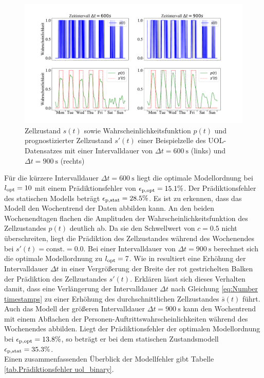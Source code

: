 \begin{figure}[!h]
	\centering
	\includegraphics[width=1.0\linewidth]{Abbildungen/evaluation/bin_size_influence_cell_row_23_col_25_binary_numero_due}
	\caption{Zellzustand $s(t)$ sowie Wahrscheinlichkeitsfunktion $p(t)$ und prognostizierter Zellzustand $s'(t)$ einer Beispielzelle des UOL-Datensatzes mit einer Intervalldauer von $\Delta t = \SI{600}{\second} $ (links) und $\Delta t = \SI{900}{\second} $ (rechts)}
	\label{fig.bin_size_influence_cell_row_23_col_25_binary}
\end{figure}

Für die kürzere Intervalldauer $\Delta t = \SI{600}{\second}$ liegt die optimale Modellordnung bei $l_{\mathrm{opt}} = 10$ mit einem Prädiktionsfehler von $\epsilon_{\mathrm{p,opt}} = 15.1 \%$. Der Prädiktionsfehler des statischen Modells beträgt $\epsilon_{\mathrm{p,stat}} = 28.5 \%$. Es ist zu erkennen, dass das Modell den Wochentrend der Daten abbilden kann. An den beiden Wochenendtagen flachen die Amplituden der Wahrscheinlichkeitsfunktion des Zellzustandes $p(t)$ deutlich ab. Da sie den Schwellwert von $c = 0.5$ nicht überschreiten, liegt die Prädiktion des Zellzustandes während des Wochenendes bei $s'(t) = \mathrm{const}. = 0.0$. Bei einer Intervalldauer von $\Delta t = \SI{900}{\second} $ berechnet sich die optimale Modellordnung zu $l_{\mathrm{opt}} = 7$. Wie in  resultiert eine Erhöhung der Intervalldauer $\Delta t$ in einer Vergrößerung der Breite der rot gestrichelten Balken der Prädiktion des Zellzustandes $s'(t)$. Erklären lässt sich dieses Verhalten damit, dass eine Verlängerung der Intervalldauer $\Delta t$ nach Gleichung \ref{eq:Number timestamps} zu einer Erhöhung des durchschnittlichen Zellzustandes $\bar{s}(t)$ führt. Auch das Modell der größeren Intervalldauer $\Delta t = \SI{900}{\second}$ kann den Wochentrend mit einem Abflachen der Personen-Auftrittswahrscheinlichkeiten während des Wochenendes abbilden. Liegt der Prädiktionsfehler der optimalen Modellordnung bei $\epsilon_{\mathrm{p,opt}} = 13.8 \%$, so beträgt er bei dem statischen Zustandsmodell $\epsilon_{\mathrm{p,stat}} = 35.3 \%$. \\
Einen zusammenfassenden Überblick der Modellfehler gibt Tabelle \ref{tab.Prädiktionsfehler uol_binary}.

